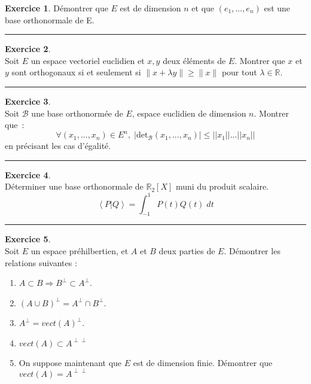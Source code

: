 \documentclass[a4paper,10pt]{article}
\theoremstyle{definition}
\theoremstyle{definition}
\newtheorem{exo}{Exercice}
\newcommand{\R}{\mathbb{R}}
\begin{document}
\begin{minipage}{1\linewidth}
\begin{minipage}[t]{0.48\linewidth}
\begin{exo}
		Démontrer que $E$ est de dimension $n$ et que $(e_1,...,e_n)$ est une base orthonormale de E.
	
		
		\centering
		\rule{1\linewidth}{0.6pt}
	\end{exo}	
		
		
		
		\begin{exo}\quad\\[0.25cm]
			Soit $E$ un espace vectoriel euclidien et $x,y$ deux éléments de $E$. Montrer que $x$ et $y$ sont orthogonaux si et seulement si $\| x+\lambda y \| \geq \|x\|$ pour tout $\lambda\in\R$.
			
			\centering
			\rule{1\linewidth}{0.6pt}
		\end{exo}
	
		\begin{exo}\quad\\[0.25cm]
		Soit $\mathcal{B}$ une base orthonormée de $E$, espace euclidien de dimension $n$.
		Montrer que~:~$$\forall(x_1,...,x_n)\in E^n,\;|\mbox{det}_{\mathcal{B}}(x_1,...,x_n)|\leq||x_1||...||x_n||$$ en précisant les cas d'égalité.
		
		\centering
		\rule{1\linewidth}{0.6pt}
	\end{exo}
		
		
		
		
	\end{minipage}	
	\hfill\vrule\hfill
	\begin{minipage}[t]{0.48\linewidth}
		\raggedright
		
		
		\begin{exo}\quad\\[0.25cm]
			
			Déterminer une base orthonormale de $\R_2[X]$ muni du produit scalaire. 
			 $$ \left\langle P|Q\right\rangle =\int_{-1}^{1}P(t)Q(t)\;dt$$
			
			
			\rule{1\linewidth}{0.6pt}
		\end{exo}	

		\begin{exo}\quad\\[0.25cm]
		Soit $E$ un espace préhilbertien, et $A$ et $B$ deux parties de $E$. Démontrer les relations suivantes :
		\begin{enumerate}
		\item $A\subset B \Rightarrow B^{\perp}\subset A^{\perp}$.
		\item $(A\cup B)^{\perp} = A^{\perp}\cap B^{\perp}$.
		\item $A^{\perp} = vect(A)^{\perp}$.
		\item $vect(A) \subset A^{\perp \perp}$
		\item On suppose maintenant que $E$ est de dimension finie. Démontrer que $vect(A) = A^{\perp \perp}$
		\end{enumerate}
	

\end{exo}
\end{minipage}
\end{minipage}
\end{document}
